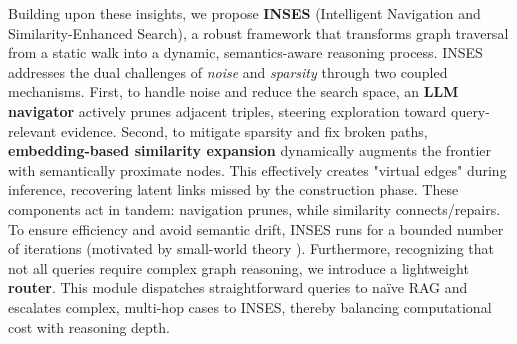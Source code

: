 \documentclass{article}
\theoremstyle{plain}
\theoremstyle{definition}
\theoremstyle{remark}
\begin{document}
Building upon these insights, we propose \textbf{INSES} (Intelligent Navigation and Similarity-Enhanced Search), a robust framework that transforms graph traversal from a static walk into a dynamic, semantics-aware reasoning process. INSES addresses the dual challenges of \textit{noise} and \textit{sparsity} through two coupled mechanisms. First, to handle noise and reduce the search space, an \textbf{LLM navigator} actively prunes adjacent triples, steering exploration toward query-relevant evidence. Second, to mitigate sparsity and fix broken paths, \textbf{embedding-based similarity expansion} dynamically augments the frontier with semantically proximate nodes. This effectively creates "virtual edges" during inference, recovering latent links missed by the construction phase. These components act in tandem: navigation prunes, while similarity connects/repairs. To ensure efficiency and avoid semantic drift, INSES runs for a bounded number of iterations (motivated by small-world theory \citep{milgram1967small}). Furthermore, recognizing that not all queries require complex graph reasoning, we introduce a lightweight \textbf{router}. This module dispatches straightforward queries to naïve RAG and escalates complex, multi-hop cases to INSES, thereby balancing computational cost with reasoning depth.

\end{document}
